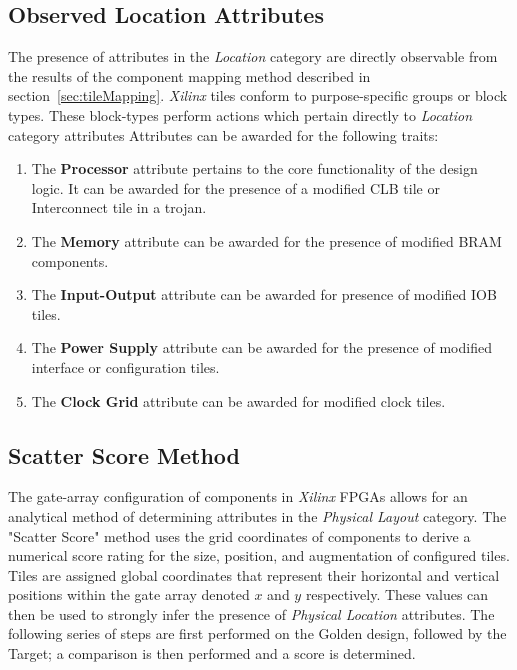 \documentclass[journal, hidelinks]{IEEEtran}
\begin{document}
\subsection{Observed Location Attributes}
The presence of attributes in the \textit{Location} category are directly observable from the results of the component mapping method described in section~\ref{sec:tileMapping}.
\textit{Xilinx} tiles conform to purpose-specific groups or block types.
These block-types perform actions which pertain directly to \textit{Location} category attributes
Attributes can be awarded for the following traits: 
\begin{enumerate}
	\item The \textbf{Processor} attribute pertains to the core functionality of the design logic. It can be awarded for the presence of a modified CLB tile or Interconnect tile in a trojan.
	\item The \textbf{Memory} attribute can be awarded for the presence of modified BRAM components.
	\item The \textbf{Input-Output} attribute can be awarded for presence of modified IOB tiles.
	\item The \textbf{Power Supply} attribute can be awarded for the presence of modified interface or configuration tiles.
	\item The \textbf{Clock Grid} attribute can be awarded for modified clock tiles.
\end{enumerate}

\subsection{Scatter Score Method} \label{sec:scatterScore}
The gate-array configuration of components in \textit{Xilinx} FPGAs allows for an analytical method of determining attributes in the \textit{Physical Layout} category.
The "Scatter Score" method uses the grid coordinates of components to derive a numerical score rating for the size, position, and augmentation of configured tiles.
Tiles are assigned global coordinates that represent their horizontal and vertical positions within the gate array denoted $x$ and $y$ respectively. 
These values can then be used to strongly infer the presence of \textit{Physical Location} attributes.
The following series of steps are first performed on the Golden design, followed by the Target; a comparison is then performed and a score is determined.
\end{document}
